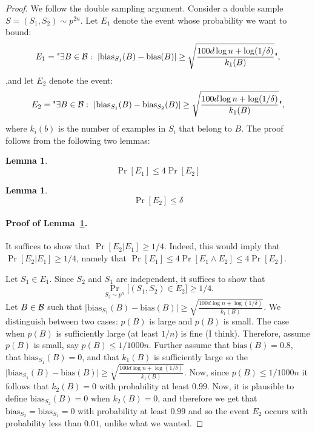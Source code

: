 \documentclass{article}
\newtheorem{lemma}[theorem]{Lemma}
\newcommand{\B}{{\cal B}}
\newcommand{\bias}{\text{bias}}
\newcommand{\samp}{S}
\begin{document}
\begin{proof}
We follow the double sampling argument.
Consider a double sample $S=(\samp_1,\samp_2)\sim p^{2n}$.
Let $E_1$ denote the event whose probability we want to bound:
\[
E_1 = \text{"}\exists {B\in\B}:~\lvert \bias_{\samp_1}(B) -  \bias(B)\rvert \geq \sqrt{\frac{100d\log n + \log(1/\delta)}{k_1(B)} }\text{"}, 
\]
,and let $E_2$ denote the event:
\[
E_2 = \text{"}\exists {B\in\B}:~\lvert \bias_{\samp_1}(B) -  \bias_{\samp_2}(B)\rvert \geq \sqrt{\frac{100d\log n + \log(1/\delta)}{k_1(B)} }\text{"},
\]
where $k_i(b)$ is the number of examples in $S_i$ that belong to $B$.
The proof follows from the following two lemmas:
\begin{lemma}\label{lem:aux1}
\[\Pr[E_1]\leq 4\Pr[E_2]\]
\end{lemma}
\begin{lemma}
\[\Pr[E_2]\leq \delta\]
\end{lemma}

\paragraph{Proof of Lemma~\ref{lem:aux1}.}

It suffices to show that $\Pr[E_2 \vert E_1]\geq 1/4$.
Indeed, this would imply that $\Pr[E_2 \vert E_1]\geq 1/4$, 
namely that $\Pr[E_1] \leq 4\Pr[E_1 \land E_2]\leq 4\Pr[E_2]$.

Let $S_1\in E_1$. Since $S_2$ and $S_1$ are independent,
it suffices to show that 
\[\Pr_{S_2\sim p^n}\bigl[(S_1,S_2)\in E_2\bigr] \geq 1/4.\]
Let $B\in\B$ such that $\lvert \bias_{\samp_1}(B) -  \bias(B)\rvert \geq \sqrt{\frac{100d\log n + \log(1/\delta)}{k_1(B)} }$.
We distinguish between two cases: $p(B)$ is large and $p(B)$ is small.
The case when $p(B)$ is sufficiently large (at least $1/n$) is fine (I think).
Therefore, assume $p(B)$ is small, say $p(B) \leq 1/1000n$.
Further assume that $\bias(B) = 0.8$,  that $\bias_{\samp_1}(B)=0$, and that $k_1(B)$
is sufficiently large so the $\lvert \bias_{\samp_1}(B) -  \bias(B)\rvert \geq \sqrt{\frac{100d\log n + \log(1/\delta)}{k_1(B)} }$.
Now, since $p(B) \leq 1/1000n$ it follows that $k_2(B)=0$ with probability at least $0.99$.
Now, it is plausible to define $\bias_{\samp_2}(B)=0$ when $k_2(B)=0$,
and therefore we get that $\bias_{\samp_2}=\bias_{\samp_1}=0$ with probability at least $0.99$ and so the event $E_2$ occurs with probability less than $0.01$,
unlike what we wanted.
\end{proof}
\end{document}
